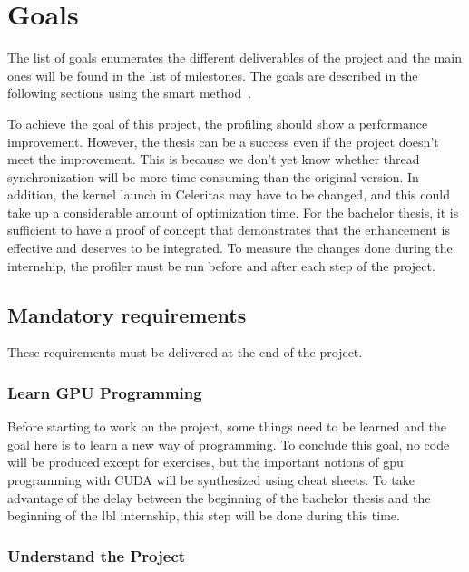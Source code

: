 \chapter{Goals}
\label{spec:ch:goals}

The list of goals enumerates the different deliverables of the project and the main ones will be found in the list of milestones.
The goals are described in the following sections using the \acrshort{smart} method~\cite{how_to_write_smart_goals_kat_boogaard}.

To achieve the goal of this project, the profiling should show a performance improvement.
However, the thesis can be a success even if the project doesn't meet the improvement.
This is because we don't yet know whether thread synchronization will be more time-consuming than the original version.
In addition, the kernel launch in Celeritas may have to be changed, and this could take up a considerable amount of optimization time.
For the bachelor thesis, it is sufficient to have a proof of concept that demonstrates that the enhancement is effective and deserves to be integrated.
To measure the changes done during the internship, the profiler must be run before and after each step of the project.

\section{Mandatory requirements}
\label{spec:ch:goals:mandatory-requirements}

These requirements must be delivered at the end of the project.


\subsection{Learn GPU Programming}
\label{spec:ch:goals:mandatory-requirements:learn-gpu-programming}

Before starting to work on the project, some things need to be learned and the goal here is to learn a new way of programming.
To conclude this goal, no code will be produced except for exercises, but the important notions of \acrshort{gpu} programming with CUDA will be synthesized using cheat sheets.
To take advantage of the delay between the beginning of the bachelor thesis and the beginning of the \acrshort{lbl} internship, this step will be done during this time.


\subsection{Understand the Project}
\label{spec:ch:goals:mandatory-requirements:understand-the-project}

